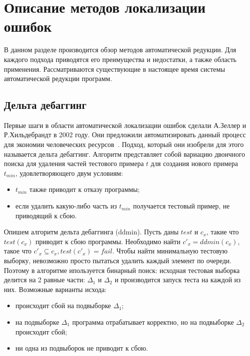 \chapter{Описание методов локализации ошибок}
В данном разделе производится обзор методов автоматической редукции. Для каждого подхода приводятся его преимущества и недостатки, а также область применения. Рассматриваются существующие в настоящее время системы автоматической редукции программ.
\section{Дельта дебаггинг}
Первые шаги в области автоматической локализации ошибок сделали А.Зеллер и Р.Хильдебрандт в 2002 году. Они предложили автоматизировать данный процесс для экономии человеческих ресурсов~\cite{zeller2002simplifying}. Подход, который они изобрели для этого называется дельта дебаггинг. Алгоритм представляет собой вариацию двоичного поиска для удаления частей тестового примера $t$ для создания нового примера $t_{min}$, удовлетворяющего двум условиям:
\begin{itemize}
\item $t_{min}$ также приводит к отказу программы;
\item если удалить какую-либо часть из $t_{min}$ получается тестовый пример, не приводящий к сбою.
\end{itemize}
Опишем алгоритм дельта дебаггинга (ddmin). Пусть даны $test$ и $c_x$, такие что $test(c_x)$ приводит к сбою программы. Необходимо найти $c'_x = ddmin(c_x)$, такое что $c'_x \subseteq c_x, test(c'_x) = fail$. Чтобы найти минимальную тестовую выборку, невозможно просто пытаться удалить каждый элемент по очереди. Поэтому в алгоритме ипользуется бинарный поиск: исходная тестовая выборка делится на 2 равные части: $\Delta_1$ и $\Delta_2$ и производится запуск теста на каждой из них. Возможные варианты исхода:
\begin{itemize}
\item происходит сбой на подвыборке $\Delta_1$;
\item на подвыборке $\Delta_1$ программа отрабатывает корректно, но на подвыборке $\Delta_2$ происходит сбой;
\item ни одна из подвыборок не приводит к сбою.
\end{itemize}
